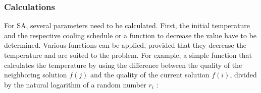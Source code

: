 %

%
%



\subsubsection{Calculations}
\label{subsubsec:SACalculations}

For SA, several parameters need to be calculated.
First, the initial temperature and the respective cooling schedule or a function to decrease the value have to be determined.
Various functions can be applied, provided that they decrease the temperature and are suited to the problem.
For example, a simple function that calculates the temperature by using the difference between the quality of the neighboring solution $f(j)$ and the quality of the current solution $f(i)$, divided by the natural logarithm of a random number $r_i$ \cite{zhan_list-based_2016}: 

